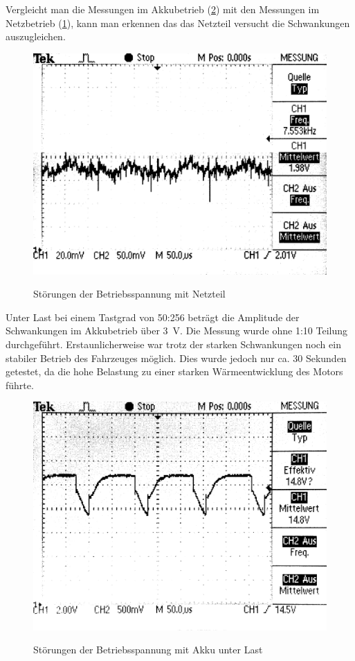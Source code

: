 Vergleicht man die Messungen im Akkubetrieb (\cref{fig:akku_supply}) mit den Messungen im Netzbetrieb (\cref{fig:power_supply}), kann man erkennen das das Netzteil versucht die Schwankungen auszugleichen.

\begin{figure}[H]
\centering
\includegraphics[width=.8\textwidth]{VCC_SUPPLY.png}\\
\caption{Störungen der Betriebsspannung mit Netzteil}%
\label{fig:power_supply}
\end{figure}

Unter Last bei einem Tastgrad von 50:256 beträgt die Amplitude der Schwankungen im Akkubetrieb über \SI{3}{V}. Die Messung wurde ohne 1:10 Teilung durchgeführt.
Erstaunlicherweise war trotz der starken Schwankungen noch ein stabiler Betrieb des Fahrzeuges möglich. Dies wurde jedoch nur ca. 30 Sekunden getestet, da
die hohe Belastung zu einer starken Wärmeentwicklung des Motors führte.

\begin{figure}[H]
\centering
\includegraphics[width=.8\textwidth]{VCC_AKKU_LAST.png}\\
\caption{Störungen der Betriebsspannung mit Akku unter Last}%
\label{fig:akku_supply}
\end{figure}


